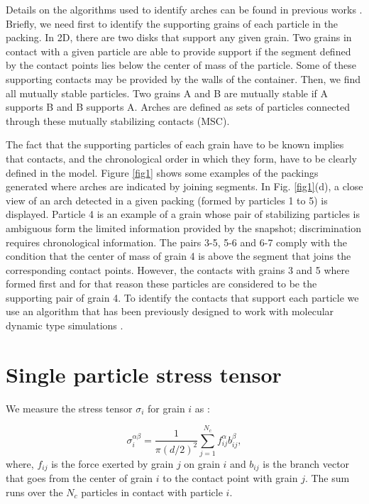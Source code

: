 Details on the algorithms used to identify arches can be found in previous works \cite{pugnaloni2,pugnaloni3,arevalo}. Briefly, we need first to identify the supporting grains of each particle in the packing. In 2D, there are two disks that support any given grain. Two grains in contact with a given particle are able to provide support if the segment defined by the contact points lies below the center of mass of the particle. Some of these supporting contacts may be provided by the walls of the container. Then, we find all mutually stable particles. Two grains A and B are mutually stable if A supports B and B supports A. Arches are defined as sets of particles connected through these mutually stabilizing contacts (MSC). 

The fact that the supporting particles of each grain have to be known implies that contacts, and the chronological order in which they form, have to be clearly defined in the model. Figure \ref{fig1} shows some examples of the packings generated where arches are indicated by joining segments. In Fig. \ref{fig1}(d), a close view of an arch detected in a given packing (formed by particles 1 to 5) is displayed. Particle 4 is an example of a grain whose pair of stabilizing particles is ambiguous form the limited information provided by the snapshot; discrimination requires chronological information. The pairs 3-5, 5-6 and 6-7 comply with the condition that the center of mass of grain 4 is above the segment that joins the corresponding contact points. However, the contacts with grains 3 and 5 where formed first and for that reason these particles are considered to be the supporting pair of grain 4. To identify the contacts that support each particle we use an algorithm that has been previously designed to work with molecular dynamic type simulations \cite{arevalo}.


\section{Single particle stress tensor}

We measure the stress tensor $\sigma_i$ for grain $i$ as \cite{latzel}:

\begin{equation}
 \sigma_i^{\alpha\beta}= \frac{1}{\pi (d/2)^2} \sum_{j=1}^{N_c}{f_{ij}^\alpha b_{ij}^\beta}, \label{eq1}
\end{equation}
where, $f_{ij}$ is the force exerted by grain $j$ on grain $i$ and $b_{ij}$ is the branch vector that goes from the center of grain $i$ to the contact point with grain $j$. The sum runs over the $N_c$ particles in contact with particle $i$.  

